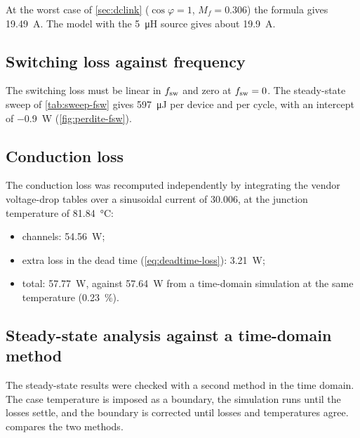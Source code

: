 At the worst case of \cref{sec:dclink} ($\cos\varphi = 1$, $M_f = 0.306$) the
formula gives \SI{19.49}{\ampere}. The model with the \SI{5}{\micro\henry}
source gives about \SI{19.9}{\ampere}.

\subsection{Switching loss against frequency}

The switching loss must be linear in $f_{\mathrm{sw}}$ and zero at $f_{\mathrm{sw}} = 0$. The
steady-state sweep of \cref{tab:sweep-fsw} gives \SI{597}{\micro\joule} per
device and per cycle, with an intercept of \SI{-0.9}{\watt}
(\cref{fig:perdite-fsw}).

\subsection{Conduction loss}

The conduction loss was recomputed independently by integrating the vendor
voltage-drop tables over a sinusoidal current of \SI{30.006}{\Arms}, at the
junction temperature of \SI{81.84}{\celsius}:
\begin{itemize}
  \item channels: \SI{54.56}{\watt};
  \item extra loss in the dead time (\cref{eq:deadtime-loss}): \SI{3.21}{\watt};
  \item total: \SI{57.77}{\watt}, against \SI{57.64}{\watt} from a
        time-domain simulation at the same temperature (\SI{0.23}{\percent}).
\end{itemize}

\subsection{Steady-state analysis against a time-domain method}

The steady-state results were checked with a second method in the time
domain. The case temperature is imposed as a boundary, the simulation runs
until the losses settle, and the boundary is corrected until losses and
temperatures agree.  compares the two methods.

